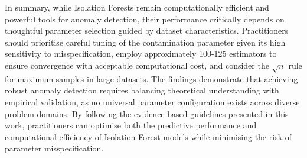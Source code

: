 \documentclass[10pt, conference]{IEEEtran}
\begin{document}
In summary, while Isolation Forests remain computationally efficient and powerful tools for anomaly detection, their performance critically depends on thoughtful parameter selection guided by dataset characteristics. Practitioners should prioritise careful tuning of the contamination parameter given its high sensitivity to misspecification, employ approximately 100-125 estimators to ensure convergence with acceptable computational cost, and consider the $\sqrt{n}$ rule for maximum samples in large datasets. The findings demonstrate that achieving robust anomaly detection requires balancing theoretical understanding with empirical validation, as no universal parameter configuration exists across diverse problem domains. By following the evidence-based guidelines presented in this work, practitioners can optimise both the predictive performance and computational efficiency of Isolation Forest models while minimising the risk of parameter misspecification.



\appendices
\end{document}
